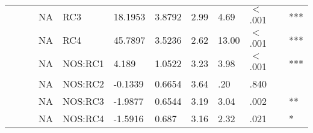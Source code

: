 \begin{table}[ht]
\begin{tabular}{lllllllllll}
   &  &  & NA & RC3 & 18.1953 & 3.8792 & 2.99 & 4.69 & $<$.001 & *** \\ 
   &  &  & NA & RC4 & 45.7897 & 3.5236 & 2.62 & 13.00 & $<$.001 & *** \\ 
   &  &  & NA & NOS:RC1 & 4.189 & 1.0522 & 3.23 & 3.98 & $<$.001 & *** \\ 
   &  &  & NA & NOS:RC2 & -0.1339 & 0.6654 & 3.64 & .20 & .840 &   \\ 
   &  &  & NA & NOS:RC3 & -1.9877 & 0.6544 & 3.19 & 3.04 & .002 & ** \\ 
   &  &  & NA & NOS:RC4 & -1.5916 & 0.687 & 3.16 & 2.32 & .021 & * \\ 
   \hline
\end{tabular}
\endgroup
\end{table}

